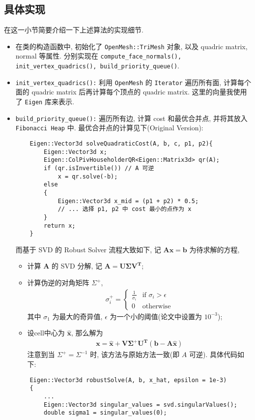 \documentclass[11pt]{article}
\newcommand\1{\mathds{1}}
\begin{document}
\subsection{具体实现}
在这一小节简要介绍一下上述算法的实现细节. 
\begin{itemize}
    \item 在类的构造函数中, 初始化了 \texttt{OpenMesh::TriMesh} 对象, 以及 quadric matrix, normal 等属性.
    分别实现在 \texttt{compute\_face\_normals(), init\_vertex\_quadrics(), build\_priority\_queue()}.
    \item \texttt{init\_vertex\_quadrics():} 利用 \texttt{OpenMesh} 的 \texttt{Iterator} 遍历所有面, 
    计算每个面的 quadric matrix 后再计算每个顶点的 quadric matrix. 这里的向量我使用了 \texttt{Eigen} 库来表示. 
    \item \texttt{build\_priority\_queue():} 遍历所有边, 计算 cost 和最优合并点, 并将其放入 \texttt{Fibonacci Heap} 中.
    最优合并点的计算见下(Original Version):
    \begin{verbatim}
    Eigen::Vector3d solveQuadraticCost(A, b, c, p1, p2){
        Eigen::Vector3d x;
        Eigen::ColPivHouseholderQR<Eigen::Matrix3d> qr(A);
        if (qr.isInvertible()) // A 可逆
            x = qr.solve(-b);
        else
        {
            Eigen::Vector3d x_mid = (p1 + p2) * 0.5;
            // ... 选择 p1, p2 中 cost 最小的点作为 x
        }
        return x;
    }
    \end{verbatim}
    而基于 SVD 的 Robust Solver 流程大致如下, 记 $\mathbf{Ax = b}$ 为待求解的方程,
    \begin{itemize}
        \item 计算 $\mathbf{A}$ 的 SVD 分解, 记 $\mathbf{A = U \Sigma V^T}$;
        \item 计算伪逆的对角矩阵 $\Sigma^+$, 
        \begin{align*}
            \sigma_i^+ = \begin{cases}
                \frac{1}{\sigma_i} & \text{if } \sigma_i > \epsilon \\
                0 & \text{otherwise}
            \end{cases}
        \end{align*}
        其中 $\sigma_1$ 为最大的奇异值, $\epsilon$ 为一个小的阈值(论文中设置为 $10^{-3}$);
        \item 设cell中心为 $\hat{\mathbf{x}}$, 那么解为
        \begin{align*}
            \mathbf{x = \hat{x} + V \Sigma^+ U^T (b - A \hat{x})}
        \end{align*}
        注意到当 $\Sigma^+ = \Sigma^{-1}$ 时, 该方法与原始方法一致(即 $A$ 可逆).
        具体代码如下:
    \end{itemize}
    \begin{verbatim}
    Eigen::Vector3d robustSolve(A, b, x_hat, epsilon = 1e-3) 
    {   
        ...
        Eigen::Vector3d singular_values = svd.singularValues();
        double sigma1 = singular_values(0);


\end{verbatim}
\end{itemize}
\end{document}
